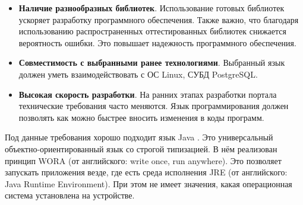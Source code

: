 \begin{itemize}
	\item \textbf{Наличие  разнообразных  библиотек}.  Использование  готовых библиотек ускоряет разработку программного обеспечения. Также важно, что благодаря использованию распространенных оттестированных библиотек снижается  вероятность  ошибки.  Это повышает надежность  программного  обеспечения.
	
	\item \textbf{Совместимость с выбранными ранее технологиями}. Выбранный  язык  должен  уметь  взаимодействовать  с  ОС  Linux,  СУБД PostgreSQL.
	
	\item \textbf{Высокая скорость разработки}. На  ранних  этапах разработки портала технические требования часто меняются. Язык программирования должен позволять как можно быстрее  вносить изменения в коды программ.
\end{itemize}

Под данные требования хорошо подходит язык Java \cite{bib:java}. Это универсальный объектно-ориентированный язык со строгой типизацией. В нём реализован принцип WORA (от английского: write once, run anywhere). Это позволяет запускать приложения везде, где есть среда исполнения JRE (от английского: Java Runtime Environment). При этом не имеет значения, какая операционная система установлена на устройстве.

